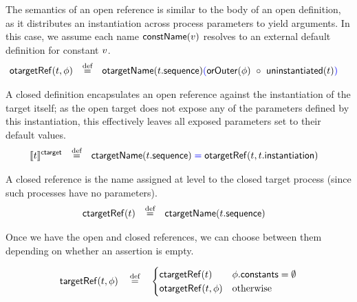 \begin{defn}
The semantics of an open reference is similar to the body of an open definition,
as it distributes an instantiation across process parameters to yield arguments.
In this case, we assume each name \(\mathsf{constName}(v)\) resolves to an
external default definition for constant \(v\).
%
\begin{align*}
	\otargetRef{\atarget}{\aninst}
\quad\defeq\quad&
	\otargetnameOf{\field{\atarget}{sequence}}
	\tlang{
	\left(
	\olang{
	\funcname{orOuter}(\aninst)\ \circ\ \funcname{uninstantiated}(\atarget)
	}
	\right)
	}
\end{align*}
\end{defn}

\begin{defn}
A closed definition encapsulates an open reference against the instantiation of
the target itself; as the open target does not expose any of the parameters
defined by this instantiation, this effectively leaves all exposed parameters
set to their default values.
%
\begin{align*}
	\llbracket t \rrbracket^{\mathsf{ctarget}}
\quad\mathbin{\overset{\text{def}}=}\quad&
	\mathsf{ctargetName}(t.\mathsf{sequence})
	\textcolor{blue}{\;=\;}
	\mathsf{otargetRef}(t, t.\mathsf{instantiation})
\end{align*}
\end{defn}

\begin{defn}
A closed reference is the name assigned at \msequence{} level to the closed
target process (since such processes have no parameters).
%
\begin{align*}
\mathsf{ctargetRef}(t)
\quad\mathbin{\overset{\text{def}}=}\quad&
\mathsf{ctargetName}(t.\mathsf{sequence})
\end{align*}
\end{defn}

Once we have the open and closed references, we can choose between them
depending on whether an assertion \mtargetinstantiation{} is empty.

\begin{defn}
\begin{align*}
\mathsf{targetRef}(t, \phi)
\quad\mathbin{\overset{\text{def}}=}\quad
\begin{cases}
	\mathsf{ctargetRef}(t) & \phi.\mathsf{constants} = \emptyset
	\\
	\mathsf{otargetRef}(t, \phi) & \text{otherwise}
\end{cases}
\end{align*}
\end{defn}

